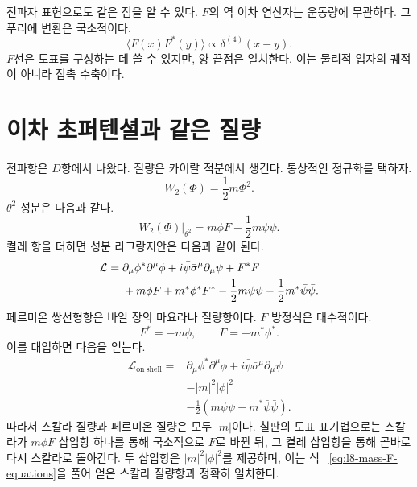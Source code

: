 전파자 표현으로도 같은 점을 알 수 있다. \(F\)의 역 이차 연산자는 운동량에 무관하다. 그 푸리에 변환은 국소적이다.
\begin{equation}
\langle F(x)F^\ast(y)\rangle
\propto \delta^{(4)}(x-y).
\label{eq:l8-F-contact}
\end{equation}
\(F\)선은 도표를 구성하는 데 쓸 수 있지만, 양 끝점은 일치한다. 이는 물리적 입자의 궤적이 아니라 접촉 수축이다.

\section{이차 초퍼텐셜과 같은 질량}

전파항은 \(D\)항에서 나왔다. 질량은 카이랄 적분에서 생긴다. 통상적인 정규화를 택하자.
\begin{equation}
W_2(\Phi)=\frac12m\Phi^2.
\end{equation}
\(\theta^2\) 성분은 다음과 같다.
\begin{equation}
\left.W_2(\Phi)\right|_{\theta^2}
=m\phi F-\frac12m\psi\psi.
\end{equation}
켤레 항을 더하면 성분 라그랑지안은 다음과 같이 된다.
\begin{align}
\mathcal L
={}&
\partial_\mu\phi^\ast\partial^\mu\phi
+i\bar\psi\bar\sigma^\mu\partial_\mu\psi
+F^\ast F
\notag\\
&+m\phi F+m^\ast\phi^\ast F^\ast
-\frac12m\psi\psi
-\frac12m^\ast\bar\psi\bar\psi.
\label{eq:l8-mass-offshell}
\end{align}
페르미온 쌍선형항은 바일 장의 마요라나 질량항이다. \(F\) 방정식은 대수적이다.
\begin{equation}
F^\ast=-m\phi,
\qquad
F=-m^\ast\phi^\ast.
\label{eq:l8-mass-F-equations}
\end{equation}
이를 대입하면 다음을 얻는다.
\begin{equation}
\begin{aligned}
\mathcal L_{\mathrm{on\ shell}}={}&
\partial_\mu\phi^\ast\partial^\mu\phi
+i\bar\psi\bar\sigma^\mu\partial_\mu\psi\\
&-|m|^2|\phi|^2\\
&-\frac12\left(m\psi\psi+m^\ast\bar\psi\bar\psi\right).
\end{aligned}
\label{eq:l8-mass-onshell}
\end{equation}
따라서 스칼라 질량과 페르미온 질량은 모두 \(|m|\)이다. 칠판의 도표 표기법으로는 스칼라가 \(m\phi F\) 삽입항 하나를 통해 국소적으로 \(F\)로 바뀐 뒤, 그 켤레 삽입항을 통해 곧바로 다시 스칼라로 돌아간다. 두 삽입항은 \(|m|^2|\phi|^2\)를 제공하며, 이는 식 ~\eqref{eq:l8-mass-F-equations}을 풀어 얻은 스칼라 질량항과 정확히 일치한다.

